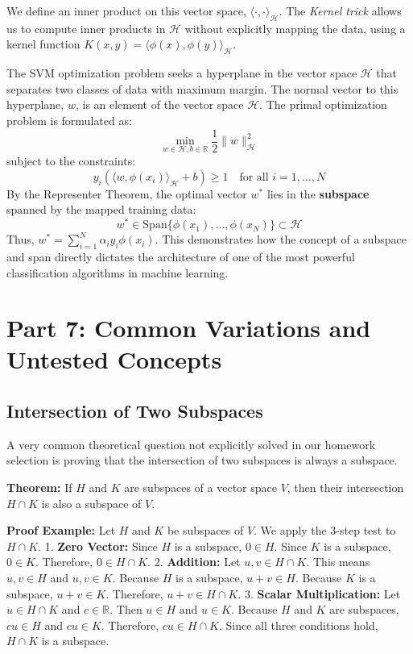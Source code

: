 \documentclass[12pt]{article}
\begin{document}
We define an inner product on this vector space, $\langle \cdot, \cdot \rangle_{\mathcal{H}}$. The \textit{Kernel trick} allows us to compute inner products in $\mathcal{H}$ without explicitly mapping the data, using a kernel function $K(x, y) = \langle \phi(x), \phi(y) \rangle_{\mathcal{H}}$.

The SVM optimization problem seeks a hyperplane in the vector space $\mathcal{H}$ that separates two classes of data with maximum margin. The normal vector to this hyperplane, $w$, is an element of the vector space $\mathcal{H}$. 
The primal optimization problem is formulated as:
\[ \min_{w \in \mathcal{H}, b \in \mathbb{R}} \frac{1}{2} \|w\|_{\mathcal{H}}^2 \]
subject to the constraints:
\[ y_i (\langle w, \phi(x_i) \rangle_{\mathcal{H}} + b) \ge 1 \quad \text{for all } i = 1, \dots, N \]
By the Representer Theorem, the optimal vector $w^*$ lies in the \textbf{subspace} spanned by the mapped training data:
\[ w^* \in \text{Span}\{ \phi(x_1), \dots, \phi(x_N) \} \subset \mathcal{H} \]
Thus, $w^* = \sum_{i=1}^N \alpha_i y_i \phi(x_i)$. This demonstrates how the concept of a subspace and span directly dictates the architecture of one of the most powerful classification algorithms in machine learning.

\newpage

\section{Part 7: Common Variations and Untested Concepts}

\subsection{Intersection of Two Subspaces}
A very common theoretical question not explicitly solved in our homework selection is proving that the intersection of two subspaces is always a subspace.

\textbf{Theorem:} If $H$ and $K$ are subspaces of a vector space $V$, then their intersection $H \cap K$ is also a subspace of $V$.

\textbf{Proof Example:}
Let $H$ and $K$ be subspaces of $V$. We apply the 3-step test to $H \cap K$.
1. \textbf{Zero Vector:} Since $H$ is a subspace, $0 \in H$. Since $K$ is a subspace, $0 \in K$. Therefore, $0 \in H \cap K$.
2. \textbf{Addition:} Let $u, v \in H \cap K$. This means $u, v \in H$ and $u, v \in K$. Because $H$ is a subspace, $u+v \in H$. Because $K$ is a subspace, $u+v \in K$. Therefore, $u+v \in H \cap K$.
3. \textbf{Scalar Multiplication:} Let $u \in H \cap K$ and $c \in \mathbb{R}$. Then $u \in H$ and $u \in K$. Because $H$ and $K$ are subspaces, $cu \in H$ and $cu \in K$. Therefore, $cu \in H \cap K$.
Since all three conditions hold, $H \cap K$ is a subspace.
\end{document}
